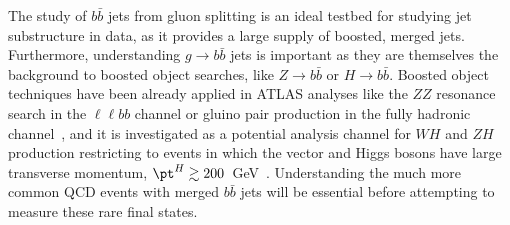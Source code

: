 The study of $b\bar{b}$ jets from gluon splitting is an ideal testbed for studying jet substructure in data, as it provides a large supply of boosted, merged jets. Furthermore, understanding $g\rightarrow b \bar{b}$ jets is important as they are themselves the background to boosted object searches, like $Z\rightarrow b\bar{b}$ or $H\rightarrow b \bar{b}$.  Boosted object techniques have been already applied in ATLAS analyses like the $ZZ$ resonance search in the $\ell\ell bb$ channel or gluino pair production in the fully hadronic channel~\cite{boosted_search}, and it is investigated as a potential analysis channel for $WH$ and $ZH$ production restricting to events in which the vector and Higgs bosons have large transverse momentum, $\pt^{H}\gtrsim 200$~GeV~\cite{Butterworth:2008iy}. Understanding the much more common QCD events with merged $b\bar{b}$ jets will be essential before attempting to measure these rare final states.

% 





